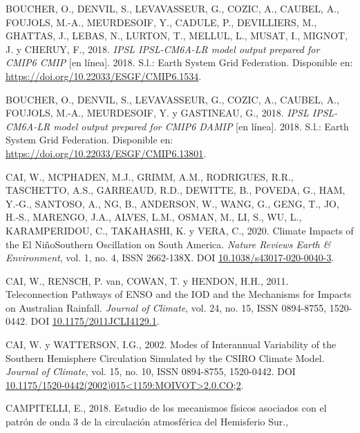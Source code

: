 \documentclass[12pt,oneside,a4paper]{reedthesis}
\newlength{\cslhangindent}
\newenvironment{CSLReferences}[2] %
 {%
  \setlength{\parindent}{0pt}
  \ifodd #1 \everypar{\setlength{\hangindent}{\cslhangindent}}\ignorespaces\fi
  \ifnum #2 > 0
  \setlength{\parskip}{#2\baselineskip}
  \fi
 }%
 {}
\begin{document}
\begin{CSLReferences}{1}{0}
\leavevmode{}%
BOUCHER, O., DENVIL, S., LEVAVASSEUR, G., COZIC, A., CAUBEL, A., FOUJOLS, M.-A., MEURDESOIF, Y., CADULE, P., DEVILLIERS, M., GHATTAS, J., LEBAS, N., LURTON, T., MELLUL, L., MUSAT, I., MIGNOT, J. y CHERUY, F., 2018. \emph{IPSL IPSL-CM6A-LR model output prepared for CMIP6 CMIP} {[}en línea{]}. 2018. S.l.: Earth System Grid Federation. Disponible en: \url{https://doi.org/10.22033/ESGF/CMIP6.1534}.

\leavevmode{}%
BOUCHER, O., DENVIL, S., LEVAVASSEUR, G., COZIC, A., CAUBEL, A., FOUJOLS, M.-A., MEURDESOIF, Y. y GASTINEAU, G., 2018. \emph{IPSL IPSL-CM6A-LR model output prepared for CMIP6 DAMIP} {[}en línea{]}. 2018. S.l.: Earth System Grid Federation. Disponible en: \url{https://doi.org/10.22033/ESGF/CMIP6.13801}.

\leavevmode{}%
CAI, W., MCPHADEN, M.J., GRIMM, A.M., RODRIGUES, R.R., TASCHETTO, A.S., GARREAUD, R.D., DEWITTE, B., POVEDA, G., HAM, Y.-G., SANTOSO, A., NG, B., ANDERSON, W., WANG, G., GENG, T., JO, H.-S., MARENGO, J.A., ALVES, L.M., OSMAN, M., LI, S., WU, L., KARAMPERIDOU, C., TAKAHASHI, K. y VERA, C., 2020. Climate Impacts of the {El Ni{ñ}o}{\textendash}{Southern Oscillation} on {South America}. \emph{Nature Reviews Earth \& Environment}, vol. 1, no. 4, ISSN 2662-138X. DOI \href{https://doi.org/10.1038/s43017-020-0040-3}{10.1038/s43017-020-0040-3}.

\leavevmode{}%
CAI, W., RENSCH, P. van, COWAN, T. y HENDON, H.H., 2011. Teleconnection {Pathways} of {ENSO} and the {IOD} and the {Mechanisms} for {Impacts} on {Australian Rainfall}. \emph{Journal of Climate}, vol. 24, no. 15, ISSN 0894-8755, 1520-0442. DOI \href{https://doi.org/10.1175/2011JCLI4129.1}{10.1175/2011JCLI4129.1}.

\leavevmode{}%
CAI, W. y WATTERSON, I.G., 2002. Modes of {Interannual Variability} of the {Southern Hemisphere Circulation Simulated} by the {CSIRO Climate Model}. \emph{Journal of Climate}, vol. 15, no. 10, ISSN 0894-8755, 1520-0442. DOI \href{https://doi.org/10.1175/1520-0442(2002)015\%3C1159:MOIVOT\%3E2.0.CO;2}{10.1175/1520-0442(2002)015\textless1159:MOIVOT\textgreater2.0.CO;2}.

\leavevmode{}%
CAMPITELLI, E., 2018. {Estudio de los mecanismos f{í}sicos asociados con el patr{ó}n de onda 3 de la circulaci{ó}n atmosf{é}rica del Hemisferio Sur}.,


\end{CSLReferences}
\end{document}
